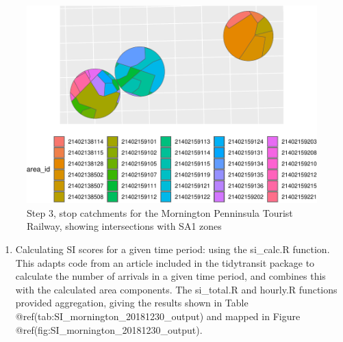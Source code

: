\documentclass[preprint, 3p,
authoryear]{elsarticle} %
\providecommand{\tightlist}{%
  \setlength{\itemsep}{0pt}\setlength{\parskip}{0pt}}
\begin{document}
\begin{figure}
\includegraphics[width=1\linewidth]{Leveraging_GTFS_to_assess_transit_supply_Transport_Geography_files/figure-latex/calculate_stop_in_or_near_areas_verbose-1} \caption{Step 3, stop catchments for the Mornington Penninsula Tourist Railway, showing intersections with SA1 zones}\label{fig:calculate_stop_in_or_near_areas_verbose}
\end{figure}

\begin{enumerate}
\def\labelenumi{(\arabic{enumi})}
\setcounter{enumi}{3}
\tightlist
\item
  Calculating SI scores for a given time period: using the si\_calc.R
  function. This adapts code from an article included in the tidytransit
  package \citep{tidytransit_departure_timetable} to calculate the
  number of arrivals in a given time period, and combines this with the
  calculated area components. The si\_total.R and hourly.R functions
  provided aggregation, giving the results shown in Table
  @ref(tab:SI\_mornington\_20181230\_output) and mapped in Figure
  @ref(fig:SI\_mornington\_20181230\_output).
\end{enumerate}
\end{document}
